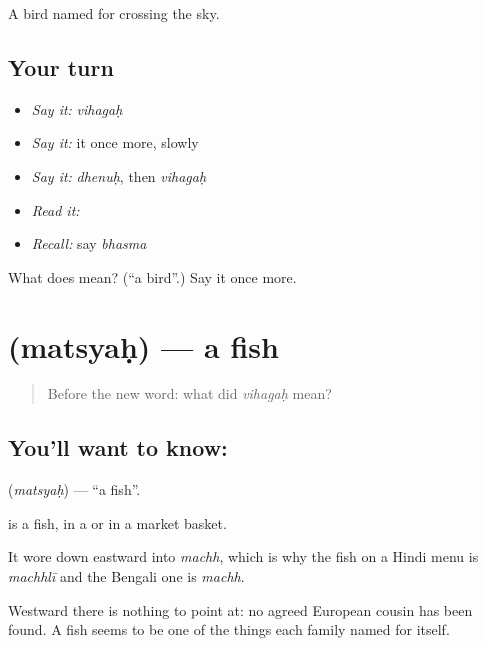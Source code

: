\begin{grammarlens}[title={What you've built}]
A bird named for crossing the sky.
\end{grammarlens}

\subsection*{Your turn}
\begin{itemize}
\raggedright
  \item \emph{Say it:} \emph{vihagaḥ}
  \item \emph{Say it:} it once more, slowly
  \item \emph{Say it:} \emph{dhenuḥ}, then \emph{vihagaḥ}
  \item \emph{Read it:} \textbf{}
  \item \emph{Recall:} say \emph{bhasma}
\end{itemize}

\begin{tcolorbox}[breakable,colback=teal!4,colframe=teal!35!black,title={Before you move on}]
What does  mean? (\textquotedblleft{}a bird\textquotedblright{}.) Say it once more.
\end{tcolorbox}
\section[\texorpdfstring{\sk{मत्स्यः} (matsyaḥ)}{मत्स्यः (matsyaḥ)}]{ (matsyaḥ) — a fish}

\label{lesson:SA-C39-fish}



\begin{quote}
Before the new word: what did \emph{vihagaḥ} mean?
\end{quote}

\subsection*{You'll want to know: }
\textbf{} (\emph{matsyaḥ}) — \textquotedblleft{}a fish\textquotedblright{}.

\textbf{} is a fish, in a  or in a market basket.

It wore down eastward into \emph{machh}, which is why the fish on a Hindi menu is \emph{machhlī} and the Bengali one is \emph{machh}.

Westward there is nothing to point at: no agreed European cousin has been found. A fish seems to be one of the things each family named for itself.

